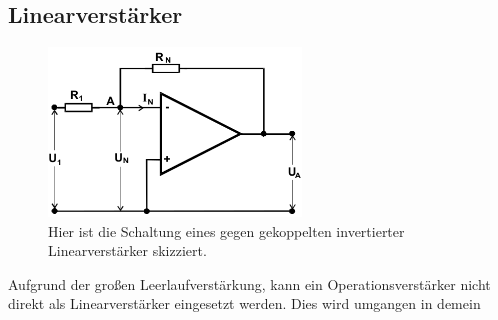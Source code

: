 \subsection{Linearverstärker}
\begin{figure}
	\centering
	\includegraphics[width = 0.6\textwidth]{../Grafiken/Gegengekoppelter_Invertierter_Liniearverstaerker.png}
	\caption{Hier ist die Schaltung eines gegen gekoppelten invertierter Linearverstärker skizziert. \cite{V51}}
\end{figure}
Aufgrund der großen Leerlaufverstärkung, kann ein Operationsverstärker nicht direkt als Linearverstärker eingesetzt werden.
Dies wird umgangen in demein 